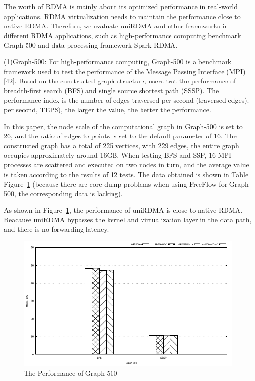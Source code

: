 The worth of RDMA is mainly about its optimized performance in real-world applications. RDMA virtualization needs to maintain the performance close to native RDMA. Therefore, we evaluate uniRDMA and other frameworks in different RDMA applications, such as high-performance computing benchmark Graph-500 and data processing framework Spark-RDMA.

(1)Graph-500: For high-performance computing, Graph-500 is a benchmark framework used to test the performance of the Message Passing Interface (MPI) [42]. Based on the constructed graph structure, users test the performance of breadth-first search (BFS) and single source shortest path (SSSP). The performance index is the number of edges traversed per second (traversed edges). per second, TEPS), the larger the value, the better the performance.

In this paper, the node scale of the computational graph in Graph-500 is set to 26, and the ratio of edges to points is set to the default parameter of 16. The constructed graph has a total of 2\^25 vertices, with 2\^29 edges, the entire graph occupies approximately around 16GB. When testing BFS and SSP, 16 MPI processes are scattered and executed on two nodes in turn, and the average value is taken according to the results of 12 tests. The data obtained is shown in Table Figure~\ref{fig:graph-500} (because there are core dump problems when using FreeFlow for Graph-500, the corresponding data is lacking).

As shown in Figure~\ref{fig:graph-500},  the performance of uniRDMA is close to native RDMA. Beacause uniRDMA bypasses the kernel and virtualization layer in the data path, and there is no  forwarding latency.

\begin{figure}[!ht]
	\centering
	\includegraphics[width=1.0\linewidth]{images/graph-500.pdf}
	\caption{The Performance of Graph-500}
	\label{fig:graph-500}
\end{figure}
